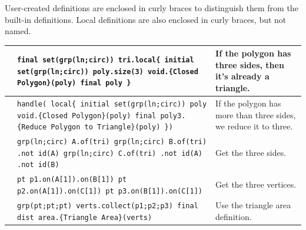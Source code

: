 \documentclass[twoside,11pt]{report}
\begin{document}
User-created definitions are enclosed in curly braces to distinguish them from the built-in definitions. 
Local definitions are also enclosed in curly braces, but not named. \\

\noindent \begin{tabularx}{\textwidth}{l X p{4cm}}
\hspace{3.5cm} & {\tt final set(grp(ln;circ)) tri.local\{ \newline
  initial set(grp(ln;circ)) poly.size(3) \newline
  void.\{Closed Polygon\}(poly) \newline
  final poly \newline
\}} & {\small If the polygon has three sides, then it's already a triangle. } \\
\hline
 & {\tt handle( local\{ \newline
  initial set(grp(ln;circ)) poly \newline
  void.\{Closed Polygon\}(poly) \newline
  final poly3.\{Reduce Polygon to \newline Triangle\}(poly) \newline
\})} & {\small If the polygon has more than three sides, we reduce it to three. } \\
\hline
 & {\tt grp(ln;circ) A.of(tri) \newline
        grp(ln;circ) B.of(tri) \newline
        .not id(A) \newline
        grp(ln;circ) C.of(tri) \newline
        .not id(A) \newline
        .not id(B) } & {\small Get the three sides. } \\
\hline
\vspace{1.5cm} & {\tt pt p1.on(A[1]).on(B[1]) \newline
        pt p2.on(A[1]).on(C[1]) \newline
        pt p3.on(B[1]).on(C[1])} & {\small Get the three vertices. } \\
\hline
\vspace{1.5cm} & {\tt grp(pt;pt;pt) verts.collect(p1;p2;p3) \newline
        final dist area.\{Triangle Area\}(verts)} & {\small Use the triangle area definition. } \\
\end{tabularx}\\\\
\end{document}
